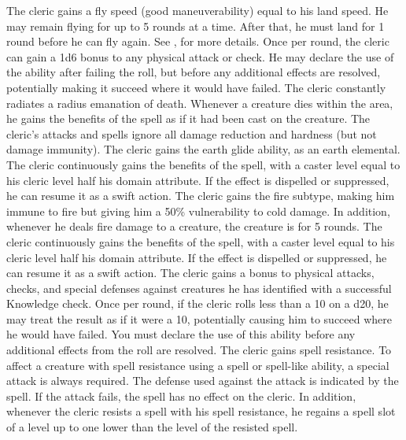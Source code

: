  The cleric gains a fly speed (good maneuverability) equal to his land speed. He may remain flying for up to 5 rounds at a time. After that, he must land for 1 round before he can fly again. See , for more details.
 Once per round, the cleric can gain a \plus1d6 bonus to any physical attack or check. He may declare the use of the ability after failing the roll, but before any additional effects are resolved, potentially making it succeed where it would have failed.
 The cleric constantly radiates a \areamed radius emanation of death. Whenever a creature dies within the area, he gains the benefits of the  spell as if it had been cast on the creature.
 The cleric's attacks and spells ignore all damage reduction and hardness (but not damage immunity).
 The cleric gains the earth glide ability, as an earth elemental.
 The cleric continuously gains the benefits of the  spell, with a caster level equal to his cleric level \add half his domain attribute. If the effect is dispelled or suppressed, he can resume it as a swift action.
 The cleric gains the fire subtype, making him immune to fire but giving him a 50\% vulnerability to cold damage. In addition, whenever he deals fire damage to a creature, the creature is \ignited for 5 rounds.
 The cleric continuously gains the benefits of the  spell, with a caster level equal to his cleric level \add half his domain attribute. If the effect is dispelled or suppressed, he can resume it as a swift action.
 The cleric gains a  bonus to physical attacks, checks, and special defenses against creatures he has identified with a successful Knowledge check.
 Once per round, if the cleric rolls less than a 10 on a d20, he may treat the result as if it were a 10, potentially causing him to succeed where he would have failed. You must declare the use of this ability before any additional effects from the roll are resolved.
 The cleric gains spell resistance. To affect a creature with spell resistance using a spell or spell-like ability, a special attack is always required. The defense used against the attack is indicated by the spell. If the attack fails, the spell has no effect on the cleric. In addition, whenever the cleric resists a spell with his spell resistance, he regains a spell slot of a level up to one lower than the level of the resisted spell.
